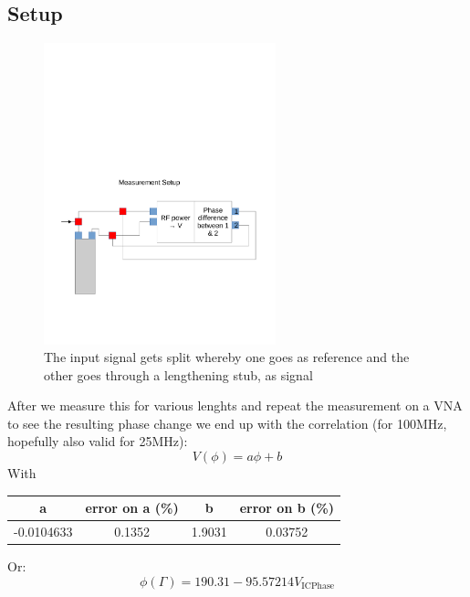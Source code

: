 \documentclass{report}
\begin{document}
\subsection{Setup}
\begin{figure}[ht!]
\centering
\includegraphics[width=0.6\textwidth]{figures/PhaseSetup.pdf}
\caption{The input signal gets split whereby one goes as reference and the other goes
through a lengthening stub, as signal}
\end{figure}
After we measure this for various lenghts and repeat the measurement on a VNA to see the resulting phase change
we end up with the correlation (for 100MHz, hopefully also valid for 25MHz):
\begin{equation}
    V(\phi) = a\phi + b
\end{equation}
With\\ 
\begin{center}
\begin{tabular}{||c c c c||}
 \hline
 a & error on a (\%) & b & error on b (\%)\\ [0.5ex]
 \hline\hline
 -0.0104633 & 0.1352 &  1.9031 & 0.03752 \\
 \hline
\end{tabular}
\end{center}
Or:
\begin{equation}
    \phi (\Gamma) =  190.31 - 95.57214 V_{\text{ICPhase}}
\end{equation}
\end{document}
